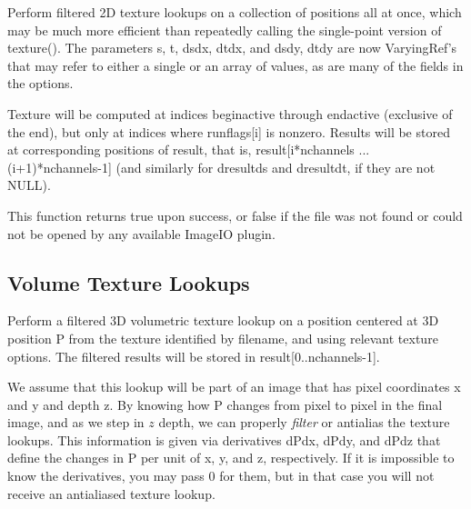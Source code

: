 Perform filtered 2D texture lookups on a collection of positions all at
once, which may be much more efficient than repeatedly calling the
single-point version of {\cf texture()}.  The parameters {\cf s},
{\cf t}, {\cf dsdx}, {\cf dtdx}, and {\cf dsdy}, {\cf dtdy} are now
{\cf VaryingRef}'s that may refer to either a single or an array of
values, as are many of the fields in the {\cf options}.

Texture will be computed at indices {\cf beginactive} through
{\cf endactive} (exclusive of the end), but only at indices where {\cf runflags[i]}
is nonzero.  Results will be stored at corresponding positions of
{\cf result}, that is, 
{\cf result[i*nchannels ... (i+1)*nchannels-1]} (and similarly for
{\cf dresultds} and {\cf dresultdt}, if they are not {\cf NULL}).

This function returns {\cf true} upon success, or {\cf false} if the
file was not found or could not be opened by any available ImageIO
plugin.
\apiend


\subsection{Volume Texture Lookups}
\label{sec:texturesys:api:texture3d}


Perform a filtered 3D volumetric texture lookup on a position centered at
3D position {\cf P} from the texture identified by
{\cf filename}, and using relevant texture {\cf options}.  The filtered
results will be stored in {\cf result[0..nchannels-1]}.

We assume that this lookup will be part of an image that has pixel
coordinates {\cf x} and {\cf y} and depth {\cf z}.  
By knowing how {\cf P} changes from
pixel to pixel in the final image, and as we step in $z$ depth, we can properly \emph{filter} or
antialias the texture lookups.  This information is given via
derivatives {\cf dPdx}, {\cf dPdy}, and {\cf dPdz} that define the changes in {\cf P}
per unit of {\cf x}, {\cf y}, and {\cf z}, respectively.  If it is impossible to
know the derivatives, you may pass 0 for them, but in that case you will
not receive an antialiased texture lookup.

